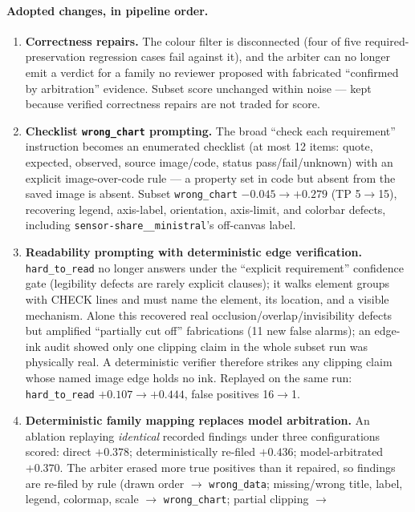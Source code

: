 \documentclass[11pt]{article}
\begin{document}
\paragraph{Adopted changes, in pipeline order.}
\begin{enumerate}
\item \textbf{Correctness repairs.} The colour filter is disconnected
  (four of five required-preservation regression cases fail against it),
  and the arbiter can no longer emit a verdict for a family no reviewer
  proposed with fabricated ``confirmed by arbitration'' evidence. Subset
  score unchanged within noise --- kept because verified correctness
  repairs are not traded for score.
\item \textbf{Checklist \texttt{wrong\_chart} prompting.} The broad
  ``check each requirement'' instruction becomes an enumerated checklist
  (at most 12 items: quote, expected, observed, source image/code,
  status pass/fail/unknown) with an explicit image-over-code rule --- a
  property set in code but absent from the saved image is absent. Subset
  \texttt{wrong\_chart} $-0.045 \to +0.279$ (TP 5$\to$15), recovering
  legend, axis-label, orientation, axis-limit, and colorbar defects,
  including \texttt{sensor-share\_\_ministral}'s off-canvas label.
\item \textbf{Readability prompting with deterministic edge
  verification.} \texttt{hard\_to\_read} no longer answers under the
  ``explicit requirement'' confidence gate (legibility defects are
  rarely explicit clauses); it walks element groups with CHECK lines and
  must name the element, its location, and a visible mechanism. Alone
  this recovered real occlusion/overlap/invisibility defects but
  amplified ``partially cut off'' fabrications (11 new false alarms); an
  edge-ink audit showed only one clipping claim in the whole subset run
  was physically real. A deterministic verifier therefore strikes any
  clipping claim whose named image edge holds no ink. Replayed on the
  same run: \texttt{hard\_to\_read} $+0.107 \to +0.444$, false positives
  16$\to$1.
\item \textbf{Deterministic family mapping replaces model arbitration.}
  An ablation replaying \emph{identical} recorded findings under three
  configurations scored: direct $+0.378$; deterministically re-filed
  $+0.436$; model-arbitrated $+0.370$. The arbiter erased more true
  positives than it repaired, so findings are re-filed by rule (drawn
  order $\to$ \texttt{wrong\_data}; missing/wrong title, label, legend,
  colormap, scale $\to$ \texttt{wrong\_chart}; partial clipping $\to$

\end{enumerate}
\end{document}
